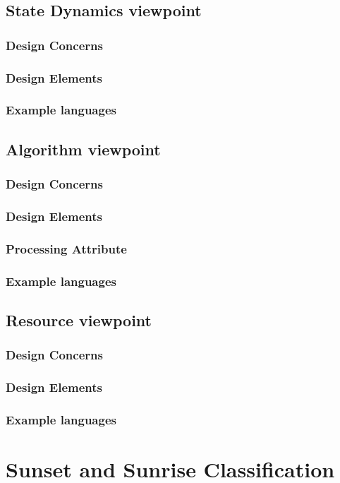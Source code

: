 \documentclass[onecolumn, draftclsnofoot,10pt, compsoc]{IEEEtran}
\begin{document}
\begin{singlespace}
	\subsection{State Dynamics viewpoint}
		\subsubsection{Design Concerns}
		\subsubsection{Design Elements}
		\subsubsection{Example languages}
	\subsection{Algorithm viewpoint}
		\subsubsection{Design Concerns}
		\subsubsection{Design Elements}
		\subsubsection{Processing Attribute}
		\subsubsection{Example languages}
	\subsection{Resource viewpoint}
		\subsubsection{Design Concerns}
		\subsubsection{Design Elements}
		\subsubsection{Example languages}
\iffalse
\section{Sunset and Sunrise Classification}

\end{singlespace}
\end{document}
